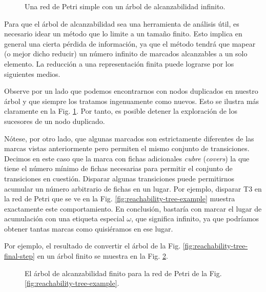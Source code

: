 \begin{figure}[!htb]
      \centering
      
      \caption{Una red de Petri simple con un árbol de alcanzabilidad infinito.}
      \label{fig:reachability-tree-bounded-net-counterexample}
\end{figure}

Para que el árbol de alcanzabilidad sea una herramienta de análisis útil, es necesario idear un
método que lo limite a un tamaño finito. Esto implica en general una cierta pérdida de
información, ya que el método tendrá que mapear (o mejor dicho reducir)
un número infinito de marcados alcanzables a un solo elemento.
La reducción a una representación finita puede lograrse por los siguientes medios.

Observe por un lado que podemos encontrarnos con nodos duplicados en nuestro árbol y que
siempre los tratamos ingenuamente como nuevos. Esto se ilustra más claramente en la Fig.
\ref{fig:reachability-tree-bounded-net-counterexample}.
Por tanto, es posible detener la exploración de los sucesores de un nodo duplicado.

Nótese, por otro lado, que algunas marcados son estrictamente diferentes de las marcas vistas
anteriormente pero permiten el mismo conjunto de transiciones. Decimos en este caso que la
marca con fichas adicionales \emph{cubre} (\textit{covers}) la que tiene el número mínimo de fichas necesarias para
permitir el conjunto de transiciones en cuestión.
Disparar algunas transiciones puede permitirnos acumular un número arbitrario de fichas en un lugar.
Por ejemplo, disparar T3 en la red de Petri que se ve en la
Fig. \ref{fig:reachability-tree-example} muestra exactamente este comportamiento.
En conclusión, bastaría con marcar el lugar de acumulación con una etiqueta especial $\omega$, que significa infinito,
ya que podríamos obtener tantas marcas como quisiéramos en ese lugar.

Por ejemplo, el resultado de convertir el árbol de la Fig. \ref{fig:reachability-tree-final-step}
en un árbol finito se muestra en la Fig. \ref{fig:reachability-tree-final-step-finite}.

\begin{figure}[!htb]
      \centering
      
      \caption{El árbol de alcanzabilidad finito para
            la red de Petri de la Fig. \ref{fig:reachability-tree-example}.}
      \label{fig:reachability-tree-final-step-finite}
\end{figure}

